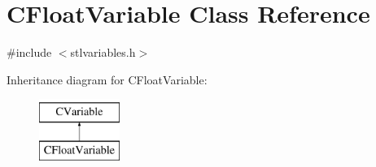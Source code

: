 \hypertarget{classCFloatVariable}{\section{C\-Float\-Variable Class Reference}
\label{classCFloatVariable}
}


{\ttfamily \#include $<$stlvariables.\-h$>$}

Inheritance diagram for C\-Float\-Variable\-:\begin{figure}[H]
\begin{center}
\leavevmode
\includegraphics[height=2.000000cm]{d3/dca/classCFloatVariable}
\end{center}
\end{figure}
